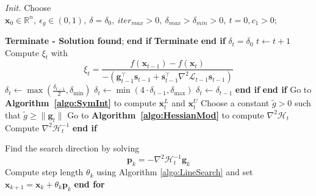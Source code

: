\documentclass{elsarticle}
\numberwithin{equation}{section}
\begin{document}
\begin{algorithm}[H]
\caption{INTHOP:A2}
\textit{Init.} Choose $\mathbf{x}_0 \in \mathbb{R}^n,\ \epsilon_g \in (0, 1),\ \delta = \delta_0,\ iter_{max} > 0,\ \delta_{max} > \delta_{min} > 0,\ t = 0, c_1>0;$\par
\begin{algorithmic}
        \State \textbf{Terminate - Solution found};
        \vspace{0.3em}
    \EndIf \textbf{end if}
        \State \textbf{Terminate}
        \vspace{0.3em}
    \EndIf \textbf{end if}
            \State $\delta_t = \delta_0$
        \Else        
            \State $t \xleftarrow{} t + 1$
            \State Compute $\xi_t$ with
                \begin{equation}
                    \xi_t = \frac{f(\mathbf{x}_{t-1}) - f(\mathbf{x}_{t})}{-(\mathbf{g}_{t-1}^\top \mathbf{s}_{t-1} + \mathbf{s}_{t-1}^\top \nabla^2 \mathcal{L}_{t-1}\mathbf{s}_{t-1})}
                \end{equation}
                    \State $\delta_{t} \gets \max\left(\frac{\delta_{t-1}}{2}, \delta_{\min}\right)$
                    \State $\delta_{t} \gets \min(4 \cdot \delta_{t-1}, \delta_{\max})$
                        \State $\delta_{t} \gets \delta_{t-1}$
                    \vspace{0.5em}
                \EndIf \textbf{end if}
                \vspace{0.5em}
        \EndIf \textbf{end if}
        \State Go to \textbf{Algorithm~\ref{algo:SymInt}} to compute $\mathbf{x}^L_t$ and $\mathbf{x}^U_t$
        \State Choose  a constant $\tilde g >0$ such that $\tilde g \geq \lVert \textbf{g}_{t}\rVert$
        \State Go to \textbf{Algorithm~\ref{algo:HessianMod}} to compute $\nabla^2 \mathcal{H}_t$
        \State Compute $\nabla^2 \mathcal{H}_t^{-1}$
    \vspace{0.5em}
    \EndIf \textbf{end if}
    
    \State Find the search direction by solving
    \begin{equation}
        \mathbf{p}_k = - \nabla^2 \mathcal{H}_t^{-1}\mathbf{g}_k
    \end{equation}
    \State Compute step length $\theta_k$ using Algorithm \ref{algo:LineSearch} and set $\mathbf{x}_{k+1} = \mathbf{x}_k + \theta_k \mathbf{p}_k$
    \vspace{0.5em}
\EndFor \textbf{end for}
\end{algorithmic}
\label{algo:TrustAdaptGlobalStructure}
\end{algorithm}
\end{document}
